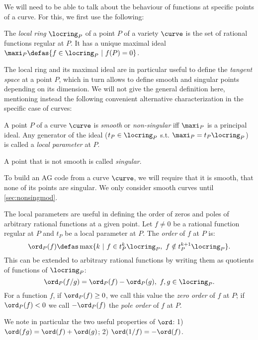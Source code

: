 We will need to be able to talk about the behaviour of functions at specific points of a curve. For this, we first use the following:

\begin{defi}
The \emph{local ring} $\locring_P$ of a point $P$ of a variety $\curve$ is the set of rational functions regular at $P$.
It has a unique maximal ideal $\maxi_P \defas \{f \in \locring_P ~|~ f(P) = 0\}$. 
\end{defi}

The local ring and its maximal ideal are in particular useful to define the \emph{tangent space} at a point $P$, which in turn allows to define smooth and singular points
depending on its dimension.
We will not give the general definition here, mentioning instead  the following convenient alternative characterization in the specific case of curves:

\begin{defi}
A point $P$ of a curve $\curve$ is \emph{smooth} or \emph{non-singular} iff $\maxi_P$ is a principal ideal. Any generator of the ideal ($t_P \in \locring_P$ s.t. $\maxi_P = t_P\locring_P$)
is called a \emph{local parameter} at $P$.

\noindent
A point that is not smooth is called \emph{singular}.
\end{defi}

To build an AG code from a curve $\curve$, we will require that it is smooth, \ie that none of its points are singular.
We only consider smooth curves until \autoref{sec:nonsingmod}.

The local parameters are useful in defining the order of zeros and poles of arbitrary rational functions at a given point.
Let $f \neq 0$ be a rational function regular at $P$ and $t_P$ be a local parameter at $P$. The \emph{order} of $f$ at $P$ is:
\[
\ord_P(f) \defas \max \{k~ |~ f \in t_P^k\locring_P,~ f \notin t_P^{k+1}\locring_P\}.
\]
This can be extended to arbitrary rational functions by writing them as quotients of functions of $\locring_P$:
\[
\ord_P(f/g) = \ord_P(f) - \ord_P(g),~f,g\in\locring_P.
\]
For a function $f$, if $\ord_P(f) \geq 0$, we call this value the \emph{zero order} of $f$ at $P$; if $\ord_P(f) < 0$
we call $-\ord_P(f)$ the \emph{pole order} of $f$ at $P$.

We note in particular the two useful properties of $\ord$:
1) $\ord(fg) = \ord(f) + \ord(g)$; 2) $\ord(1/f) = -\ord(f)$.


